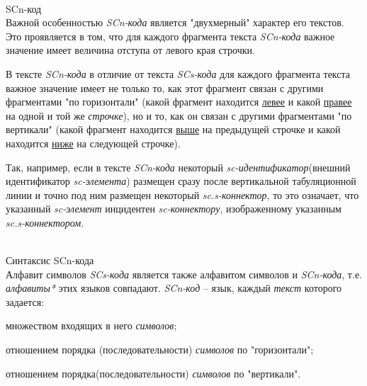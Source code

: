 \begin{frame}{\\SCn-код}
	\topline
	\justifying
	\vspace*{\fill}\\
	Важной особенностью \textit{SCn-кода} является "двухмерный"{} характер его текстов. Это проявляется в том, что для каждого фрагмента текста \textit{SCn-кода} важное значение имеет величина отступа от левого
	края строчки.
	
	В тексте \textit{SCn-кода} в отличие от текста \textit{SCs-кода} для каждого фрагмента текста важное значение имеет не только то, как этот фрагмент связан с другими фрагментами "по горизонтали"{} (какой фрагмент находится \underline{левее} и какой \underline{правее} на одной и той же \textit{строчке}), но и то, как он связан с другими фрагментами "по вертикали"{} (какой фрагмент находится \underline{выше} на предыдущей строчке и какой находится \underline{ниже} на следующей строчке). 
	
	Так, например, если в тексте \textit{SCn-кода} некоторый \textit{sc-идентификатор}(внешний идентификатор \textit{sc-элемента}) размещен сразу после вертикальной табуляционной линии и точно под ним размещен некоторый \textit{sc.s-коннектор}, то это означает, что указанный \textit{sc-элемент} инцидентен \textit{sc-коннектору}, изображенному указанным \textit{sc.s-коннектором}.
\end{frame}

\begin{frame}{\\Синтаксис SCn-кода}
	\topline
	\justifying
	\vspace*{\fill}\\
	Алфавит символов \textit{SCs-кода} является также алфавитом символов и \textit{SCn-кода}, т.е. \textit{алфавиты*} этих языков совпадают.
	\textit{SCn-код} -- язык, каждый \textit{текст} которого задается:
	\begin{textitemize}
		\item множеством входящих в него \textit{символов};
		\item отношением порядка (последовательности) \textit{символов} по "горизонтали";
		\item отношением порядка(последовательности) \textit{символов} по "вертикали"{}.
	\end{textitemize}
\end{frame}

